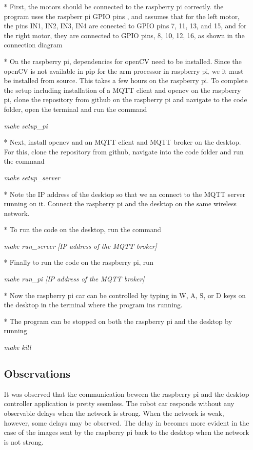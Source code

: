 \documentclass[sigconf]{acmart}
\begin{document}
* First, the motors should be connected to the raspberry pi correctly.
the program uses the raspberr pi GPIO pins , and assumes that for the left motor, the pins IN1, IN2, IN3, IN4 are conected to GPIO pins 7, 11, 13, and 15, and for the right motor, they are connected to GPIO pins, 8, 10, 12, 16, as shown in the connection diagram 


* On the raspberry pi, dependencies for openCV need to be installed. Since the openCV is not available in pip for the arm processor in raspberry pi, we it must be installed from source. This takes a few hours on the raspberry pi. To complete the setup including installation of a MQTT client and opencv on the raspberry pi, clone the repository from github on the raspberry pi and navigate to the code folder, open the terminal and run the command

{\em make setup\_pi}

* Next, install opencv and an MQTT client and MQTT broker on the desktop. For this, clone the repository from github, navigate into the code folder and run the command 

{\em make setup\_server}

* Note the IP address of the desktop so that we an connect to the MQTT server running on it. Connect the raspberry pi and the desktop on the same wireless network.

* To run the code on the desktop, run the command

{\em make run\_server [IP address of the MQTT broker]}

* Finally to run the code on the raspberry pi, run 

{\em make run\_pi [IP address of the MQTT broker]}

* Now the raspberry pi car can be controlled by typing in  W, A, S, or D keys on the desktop in the terminal where the program ins running.

* The program can be stopped on both the raspberry pi and the desktop by running 

{\em make kill}

\subsection{Observations}
It was observed that the communication beween the raspberry pi and the desktop controller application is pretty seemless. The robot car responds without any observable delays when the network is strong. When the network is weak, however, some delays may be observed. The delay in becomes more evident in the case of the images sent by the raspberry pi back to the desktop when the network is not strong.
\end{document}
